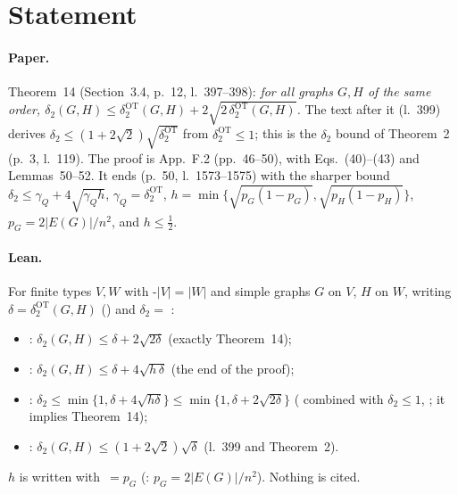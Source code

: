 

\paperversion

\section{Statement}

\paragraph{Paper.} Theorem~14 (Section~3.4, p.~12, l.~397--398): \emph{for all graphs $G,H$ of the same order,
$\delta_2(G,H)\le\delta^{\mathrm{OT}}_2(G,H)+2\sqrt{2\,\delta^{\mathrm{OT}}_2(G,H)}$.} The text after it (l.~399)
derives $\delta_2\le(1+2\sqrt2)\sqrt{\delta^{\mathrm{OT}}_2}$ from $\delta^{\mathrm{OT}}_2\le1$; this is the
$\delta_2$ bound of Theorem~2 (p.~3, l.~119). The proof is App.~F.2 (pp.~46--50), with Eqs.~(40)--(43) and
Lemmas~50--52. It ends (p.~50, l.~1573--1575) with the sharper bound
$\delta_2\le\gamma_Q+4\sqrt{\gamma_Qh}$, $\gamma_Q=\delta^{\mathrm{OT}}_2$,
$h=\min\{\sqrt{p_G(1-p_G)},\sqrt{p_H(1-p_H)}\}$, $p_G=2|E(G)|/n^2$, and $h\le\frac12$.

\paragraph{Lean.} For finite types $V,W$ with \hyp{$|V|=|W|$} and simple graphs $G$ on $V$, $H$ on $W$,
writing $\delta=\delta^{\mathrm{OT}}_2(G,H)$ () and $\delta_2=$ :
\begin{itemize}
\item {}: $\delta_2(G,H)\le\delta+2\sqrt{2\delta}$ \quad (exactly Theorem~14);
\item {}: $\delta_2(G,H)\le\delta+4\sqrt{h\,\delta}$ \quad (the end of the proof);
\item {}: $\delta_2\le\min\{1,\delta+4\sqrt{h\delta}\}\le\min\{1,\delta+2\sqrt{2\delta}\}$
  \quad ( combined with $\delta_2\le1$, ; it implies Theorem~14);
\item {}: $\delta_2(G,H)\le(1+2\sqrt2)\sqrt\delta$ \quad (l.~399 and Theorem~2).
\end{itemize}
$h$ is written 
with $\,=p_G$ (: $p_G=2|E(G)|/n^2$). Nothing is cited.

